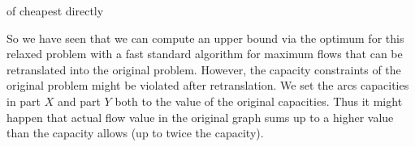 of 
cheapest 
directly 

So we have seen that we can compute an upper bound via the optimum for this relaxed problem with a fast standard 
algorithm for maximum flows that can be retranslated into the original problem. 
However, the capacity constraints of the original problem might be violated after retranslation. We set the arcs 
capacities in part $X$ and part $Y$ both to the value of the original capacities. Thus it might happen that actual flow 
value in the original graph sums up to a higher value than the capacity allows (up to twice the capacity). 


